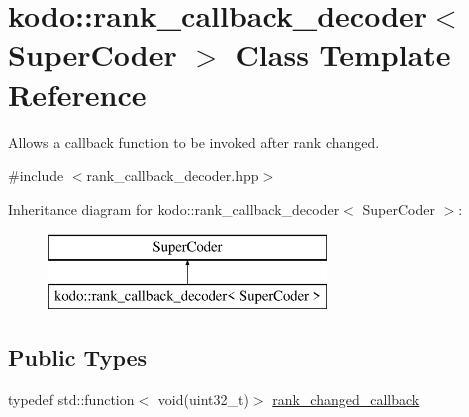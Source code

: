 \hypertarget{classkodo_1_1rank__callback__decoder}{\section{kodo\-:\-:rank\-\_\-callback\-\_\-decoder$<$ Super\-Coder $>$ Class Template Reference}
\label{classkodo_1_1rank__callback__decoder}
}


Allows a callback function to be invoked after rank changed.  




{\ttfamily \#include $<$rank\-\_\-callback\-\_\-decoder.\-hpp$>$}

Inheritance diagram for kodo\-:\-:rank\-\_\-callback\-\_\-decoder$<$ Super\-Coder $>$\-:\begin{figure}[H]
\begin{center}
\leavevmode
\includegraphics[height=2.000000cm]{classkodo_1_1rank__callback__decoder}
\end{center}
\end{figure}
\subsection*{Public Types}
\begin{DoxyCompactItemize}
\item 
typedef std\-::function$<$ void(uint32\-\_\-t)$>$ \hyperlink{classkodo_1_1rank__callback__decoder_a44bad0740473037f1e3f6a32dec28db9}{rank\-\_\-changed\-\_\-callback}
\end{DoxyCompactItemize}
